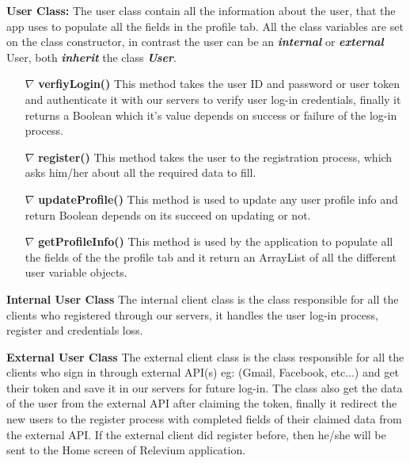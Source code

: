 \documentclass{scrreprt}
\begin{document}
     \textbf{User Class:} The user class contain all the information about the user, that the app uses to populate all the fields in the profile tab. All the class variables are set on the class constructor, in contrast the user can be an \textbf{\textit{internal}} or \textbf{\textit{external}} User, both \textit{\textbf{inherit}}  the class \textbf{\textit{User}}.
\begin{itemize}


\item[$\nabla$]  \textbf{verfiyLogin()}  This method takes the user ID and password or user token and authenticate it with our servers to verify user log-in credentials, finally it returns a Boolean which it's value depends on success or failure of the log-in process.
\item[$\nabla$] \textbf{register()} This method takes the user to the registration process, which asks him/her about all the required data to fill.
\item[$\nabla$] \textbf{updateProfile()} This method is used to update any user profile info and return Boolean depends on its succeed on updating or not.
\item[$\nabla$] \textbf{getProfileInfo()} This method is used by the application to populate all the fields of the the profile tab and it return an ArrayList of all the different user variable objects.

\end{itemize}

 \textbf{Internal User Class} The internal client class is the class responsible for all the clients who registered through our servers, it handles the user log-in process, register and credentials loss.
 
 \textbf{External User Class} The external client class is the class responsible for all the clients who sign in through external API(s) eg: (Gmail, Facebook, etc...) and get their token and save it in our servers for future log-in. The class also get the data of the user from the external API after claiming the token, finally it redirect the new users to the register process with completed fields of their claimed data from the external API. If the external client did register before, then he/she will be sent to the Home screen of Relevium application.
\end{document}
